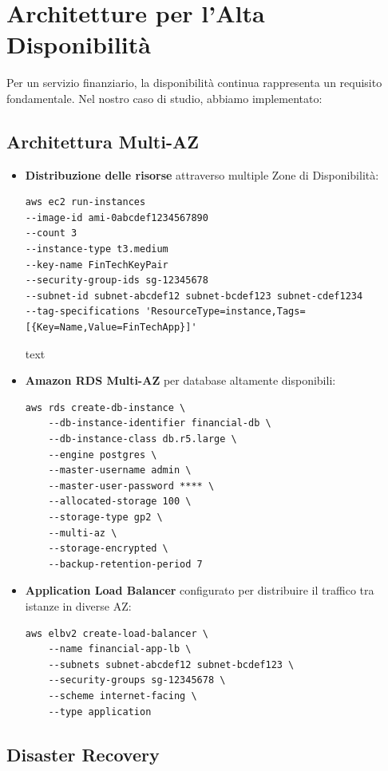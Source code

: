 \documentclass[a4paper,12pt]{report}
\begin{document}
\section{Architetture per l'Alta Disponibilità}

Per un servizio finanziario, la disponibilità continua rappresenta un requisito fondamentale. Nel nostro caso di studio, abbiamo implementato:

\subsection{Architettura Multi-AZ}

\begin{itemize}
\item \textbf{Distribuzione delle risorse} attraverso multiple Zone di Disponibilità:
\begin{verbatim}
aws ec2 run-instances
--image-id ami-0abcdef1234567890
--count 3
--instance-type t3.medium
--key-name FinTechKeyPair
--security-group-ids sg-12345678
--subnet-id subnet-abcdef12 subnet-bcdef123 subnet-cdef1234
--tag-specifications 'ResourceType=instance,Tags=[{Key=Name,Value=FinTechApp}]'
\end{verbatim}

text
\item \textbf{Amazon RDS Multi-AZ} per database altamente disponibili:
\begin{verbatim}
aws rds create-db-instance \
    --db-instance-identifier financial-db \
    --db-instance-class db.r5.large \
    --engine postgres \
    --master-username admin \
    --master-user-password **** \
    --allocated-storage 100 \
    --storage-type gp2 \
    --multi-az \
    --storage-encrypted \
    --backup-retention-period 7
\end{verbatim}

\item \textbf{Application Load Balancer} configurato per distribuire il traffico tra istanze in diverse AZ:
\begin{verbatim}
aws elbv2 create-load-balancer \
    --name financial-app-lb \
    --subnets subnet-abcdef12 subnet-bcdef123 \
    --security-groups sg-12345678 \
    --scheme internet-facing \
    --type application
\end{verbatim}
\end{itemize}

\subsection{Disaster Recovery}
\end{document}
